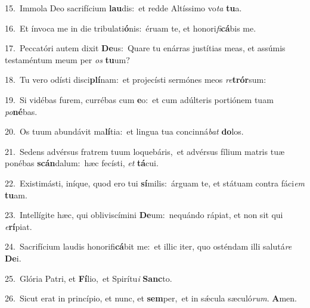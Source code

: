 {\numbfont\textcolor{\numbcolor}{15.}}~Immola Deo sacrifícium \textbf{lau}\-dis:~\star et redde Altíssimo vo\textit{ta} \textbf{tu}\-a.\par
{\numbfont\textcolor{\numbcolor}{16.}}~Et ínvoca me in die tribulati\-\textbf{ó}\-nis:~\star éruam te, et honori\-\textit{fi}\-\textbf{cá}bis me.\par
{\numbfont\textcolor{\numbcolor}{17.}}~Peccatóri autem dixit \textbf{De}\-us:~\star Quare tu enárras justítias meas, et assúmis testaméntum meum per \textit{os} \textbf{tu}\-um?\par
{\numbfont\textcolor{\numbcolor}{18.}}~Tu vero odísti disci\-\textbf{plí}\-nam:~\star et projecísti sermónes meos \textit{re}\-\textbf{trór}sum:\par
{\numbfont\textcolor{\numbcolor}{19.}}~Si vidébas furem, currébas cum \textbf{e}\-o:~\star et cum adúlteris portiónem tuam \textit{po}\-\textbf{né}bas.\par
{\numbfont\textcolor{\numbcolor}{20.}}~Os tuum abundávit ma\-\textbf{lí}\-tia:~\star et lingua tua concinná\textit{bat} \textbf{do}\-los.\par
{\numbfont\textcolor{\numbcolor}{21.}}~Sedens advérsus fratrem tuum loquebáris,~\dagger et advérsus fílium matris tuæ ponébas \textbf{scán}\-dalum:~\star hæc fecísti, \textit{et} \textbf{tá}\-cui.\par
{\numbfont\textcolor{\numbcolor}{22.}}~Existimásti, iníque, quod ero tui \textbf{sí}\-milis:~\star árguam te, et státuam contra fáci\textit{em} \textbf{tu}\-am.\par
{\numbfont\textcolor{\numbcolor}{23.}}~Intellígite hæc, qui obliviscímini \textbf{De}\-um:~\star nequándo rápiat, et non sit qui \textit{e}\-\textbf{rí}piat.\par
{\numbfont\textcolor{\numbcolor}{24.}}~Sacrifícium laudis honorifi\-\textbf{cá}\-bit me:~\star et illic iter, quo osténdam illi salutá\textit{re} \textbf{De}\-i.\par
{\numbfont\textcolor{\numbcolor}{25.}}~Glória Patri, et \textbf{Fí}\-lio,~\star et Spirítu\textit{i} \textbf{Sanc}\-to.\par
{\numbfont\textcolor{\numbcolor}{26.}}~Sicut erat in princípio, et nunc, et \textbf{sem}\-per,~\star et in sǽcula sæculó\-\textit{rum}\-. \textbf{A}\-men.\par
